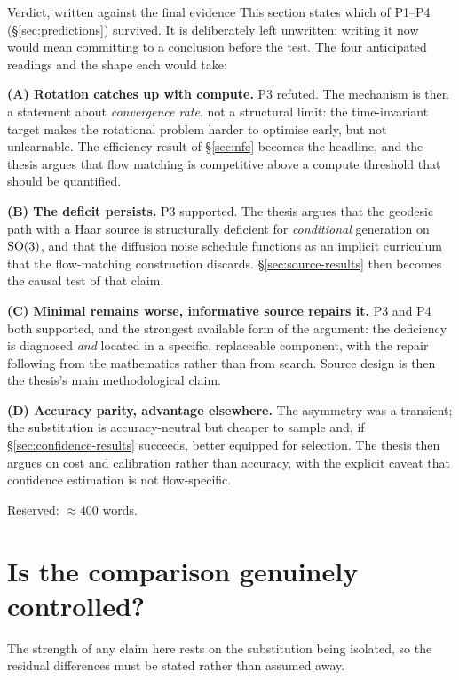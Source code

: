 \begin{reserved}{Verdict, written against the final evidence}
This section states which of P1--P4 (\S\ref{sec:predictions}) survived. It is
deliberately left unwritten: writing it now would mean committing to a
conclusion before the test. The four anticipated readings and the shape each
would take:

\textbf{(A) Rotation catches up with compute.} P3 refuted. The mechanism is
then a statement about \emph{convergence rate}, not a structural limit: the
time-invariant target makes the rotational problem harder to optimise early,
but not unlearnable. The efficiency result of \S\ref{sec:nfe} becomes the
headline, and the thesis argues that flow matching is competitive above a
compute threshold that should be quantified.

\textbf{(B) The deficit persists.} P3 supported. The thesis argues that the
geodesic path with a Haar source is structurally deficient for
\emph{conditional} generation on $\mathrm{SO}(3)$, and that the diffusion noise
schedule functions as an implicit curriculum that the flow-matching
construction discards. \S\ref{sec:source-results} then becomes the causal test
of that claim.

\textbf{(C) Minimal remains worse, informative source repairs it.} P3 and P4
both supported, and the strongest available form of the argument: the
deficiency is diagnosed \emph{and} located in a specific, replaceable
component, with the repair following from the mathematics rather than from
search. Source design is then the thesis's main methodological claim.

\textbf{(D) Accuracy parity, advantage elsewhere.} The asymmetry was a
transient; the substitution is accuracy-neutral but cheaper to sample and, if
\S\ref{sec:confidence-results} succeeds, better equipped for selection. The
thesis then argues on cost and calibration rather than accuracy, with the
explicit caveat that confidence estimation is not flow-specific.

Reserved: \(\approx 400\) words.
\end{reserved}

\section{Is the comparison genuinely controlled?}
\label{sec:controlled}

The strength of any claim here rests on the substitution being isolated, so
the residual differences must be stated rather than assumed away.

